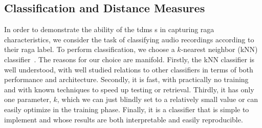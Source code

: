 \subsection{Classification and Distance Measures}
\label{sec:tdms_classification_evaluation}

% 


In order to demonstrate the ability of the \gls{tdms} s in capturing \gls{raga} characteristics, we consider the task of classifying audio recordings according to their \gls{raga} label. To perform classification, we choose a $k$-nearest neighbor (kNN) classifier~\cite{Mitchell97BOOK}. The reasons for our choice are manifold. Firstly, the kNN classifier is well understood, with well studied relations to other classifiers in terms of both performance and architecture. Secondly, it is fast, with practically no training and with known techniques to speed up testing or retrieval. Thirdly, it has only one parameter, $k$, which we can just blindly set to a relatively small value or can easily optimize in the training phase. Finally, it is a classifier that is simple to implement and whose results are both interpretable and easily reproducible. 


